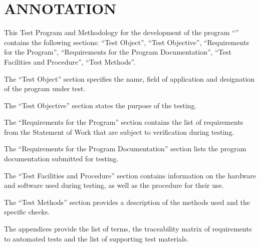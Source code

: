 \documentclass[12pt,a4paper]{extarticle}
\begin{document}
\sloppy





\section*{ANNOTATION}

This Test Program and Methodology for the development of the program \enquote{\hseProjectName} contains the following sections: \enquote{Test Object}, \enquote{Test Objective}, \enquote{Requirements for the Program}, \enquote{Requirements for the Program Documentation}, \enquote{Test Facilities and Procedure}, \enquote{Test Methods}.

The \enquote{Test Object} section specifies the name, field of application and designation of the program under test.

The \enquote{Test Objective} section states the purpose of the testing.

The \enquote{Requirements for the Program} section contains the list of requirements from the Statement of Work that are subject to verification during testing.

The \enquote{Requirements for the Program Documentation} section lists the program documentation submitted for testing.

The \enquote{Test Facilities and Procedure} section contains information on the hardware and software used during testing, as well as the procedure for their use.

The \enquote{Test Methods} section provides a description of the methods used and the specific checks.

The appendices provide the list of terms, the traceability matrix of requirements to automated tests and the list of supporting test materials.
\end{document}
